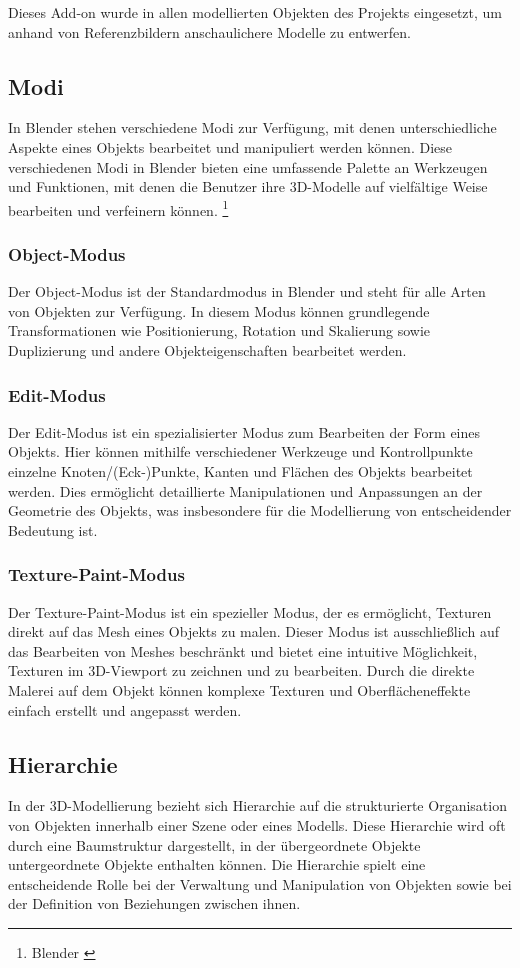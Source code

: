 Dieses Add-on wurde in allen modellierten Objekten des Projekts eingesetzt, um anhand von Referenzbildern anschaulichere Modelle zu entwerfen.

\subsection{Modi}
In Blender stehen verschiedene Modi zur Verfügung, mit denen unterschiedliche Aspekte eines Objekts bearbeitet und manipuliert werden können. Diese verschiedenen Modi in Blender bieten eine umfassende Palette an Werkzeugen und Funktionen, mit denen die Benutzer ihre 3D-Modelle auf vielfältige Weise bearbeiten und verfeinern können. \footnote{Blender \cite{Modi}}

\subsubsection{Object-Modus}
Der Object-Modus ist der Standardmodus in Blender und steht für alle Arten von Objekten zur Verfügung. In diesem Modus können grundlegende Transformationen wie Positionierung, Rotation und Skalierung sowie Duplizierung und andere Objekteigenschaften bearbeitet werden.

\subsubsection{Edit-Modus}
Der Edit-Modus ist ein spezialisierter Modus zum Bearbeiten der Form eines Objekts. Hier können mithilfe verschiedener Werkzeuge und Kontrollpunkte einzelne Knoten/(Eck-)Punkte, Kanten und Flächen des Objekts bearbeitet werden. Dies ermöglicht detaillierte Manipulationen und Anpassungen an der Geometrie des Objekts, was insbesondere für die Modellierung von entscheidender Bedeutung ist.

\subsubsection{Texture-Paint-Modus}
Der Texture-Paint-Modus ist ein spezieller Modus, der es ermöglicht, Texturen direkt auf das Mesh eines Objekts zu malen. Dieser Modus ist ausschließlich auf das Bearbeiten von Meshes beschränkt und bietet eine intuitive Möglichkeit, Texturen im 3D-Viewport zu zeichnen und zu bearbeiten. Durch die direkte Malerei auf dem Objekt können komplexe Texturen und Oberflächeneffekte einfach erstellt und angepasst werden.

\subsection{Hierarchie}
In der 3D-Modellierung bezieht sich Hierarchie auf die strukturierte Organisation von Objekten innerhalb einer Szene oder eines Modells. Diese Hierarchie wird oft durch eine Baumstruktur dargestellt, in der übergeordnete Objekte untergeordnete Objekte enthalten können. Die Hierarchie spielt eine entscheidende Rolle bei der Verwaltung und Manipulation von Objekten sowie bei der Definition von Beziehungen zwischen ihnen.

